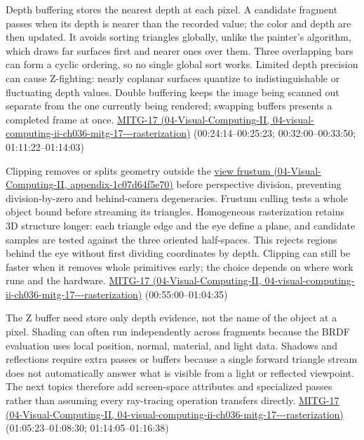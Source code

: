 Depth buffering stores the nearest depth at each pixel. A candidate fragment passes when its depth is nearer than the recorded value; the color and depth are then updated. It avoids sorting triangles globally, unlike the painter's algorithm, which draws far surfaces first and nearer ones over them. Three overlapping bars can form a cyclic ordering, so no single global sort works. Limited depth precision can cause Z-fighting: nearly coplanar surfaces quantize to indistinguishable or fluctuating depth values. Double buffering keeps the image being scanned out separate from the one currently being rendered; swapping buffers presents a completed frame at once. \href{../04-Visual-Computing-II/main.pdf\#nameddest=04-visual-computing-ii-ch036-mitg-17---rasterization}{MITG-17 (04-Visual-Computing-II, 04-visual-computing-ii-ch036-mitg-17-\/-\/-rasterization)} (00:24:14--00:25:23; 00:32:00--00:33:50; 01:11:22--01:14:03)

Clipping removes or splits geometry outside the \href{../04-Visual-Computing-II/main.pdf\#nameddest=appendix-1c07d64f5e70}{view frustum (04-Visual-Computing-II, appendix-1c07d64f5e70)} before perspective division, preventing division-by-zero and behind-camera degeneracies. Frustum culling tests a whole object bound before streaming its triangles. Homogeneous rasterization retains 3D structure longer: each triangle edge and the eye define a plane, and candidate samples are tested against the three oriented half-spaces. This rejects regions behind the eye without first dividing coordinates by depth. Clipping can still be faster when it removes whole primitives early; the choice depends on where work runs and the hardware. \href{../04-Visual-Computing-II/main.pdf\#nameddest=04-visual-computing-ii-ch036-mitg-17---rasterization}{MITG-17 (04-Visual-Computing-II, 04-visual-computing-ii-ch036-mitg-17-\/-\/-rasterization)} (00:55:00--01:04:35)

The Z buffer need store only depth evidence, not the name of the object at a pixel. Shading can often run independently across fragments because the BRDF evaluation uses local position, normal, material, and light data. Shadows and reflections require extra passes or buffers because a single forward triangle stream does not automatically answer what is visible from a light or reflected viewpoint. The next topics therefore add screen-space attributes and specialized passes rather than assuming every ray-tracing operation transfers directly. \href{../04-Visual-Computing-II/main.pdf\#nameddest=04-visual-computing-ii-ch036-mitg-17---rasterization}{MITG-17 (04-Visual-Computing-II, 04-visual-computing-ii-ch036-mitg-17-\/-\/-rasterization)} (01:05:23--01:08:30; 01:14:05--01:16:38)

